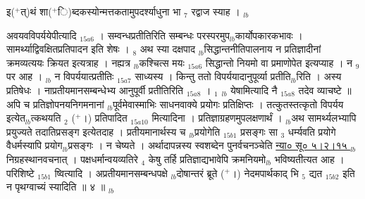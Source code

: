 \documentclass[article,12pt,a4paper]{memoir}%
\newcommand{\add}[1]{($^{+}$#1)}
\newcounter{parCount}
\begin{document}
	  
	  \pstart \leavevmode%
	इ\add{त्}थं शा\add{ि}ब्दकस्योन्मत्तकतामुपदर्श्याधुना {\color{DodgerBlue3}भा {\tiny $_{7}$} रद्वाज} स्याह ।
	{}
	\pend%
      {\tiny $_{lb}$}

	  
	  \pstart \leavevmode%
	\hphantom{.}{\color{DodgerBlue3}अवयवविपर्ययेपीत्यादि} {\tiny $_{15a6}$} । सम्वन्धप्रतीतिरिति सम्बन्धः परस्परमुप{\tiny $_{lb}$}कार्योपकारकभावः । सामर्थ्याद्विवक्षितप्रतिपादन इति शेषः । {\tiny $_{8}$} अथ स्या {\color{DodgerBlue3}दक्षपाद} {\tiny $_{lb}$}सिद्धान्तनीतिपालनाय न प्रतिज्ञादीनां क्रमव्यत्ययः क्रियत इत्यत्राह । {\color{DodgerBlue3}नह्यत्र {\tiny $_{lb}$}कश्चित्स} मयः {\tiny $_{15a6}$} सिद्धान्तो नियमो वा प्रमाणोपेत इत्यप्याह । न {\tiny $_{9}$} \leavevmode{} पर आह । {\tiny $_{lb}$} {\color{DodgerBlue3}न विपर्ययात्प्रतीतिः} {\tiny $_{15a7}$} साध्यस्य । किन्तु ततो विपर्ययादानुपूर्व्या प्रतीति{\tiny $_{lb}$}रिति । अस्य प्रतिषेधः । {\color{DodgerBlue3}नाप्रतीयमानसम्बन्धेभ्य आनुपूर्वी प्रतीतिरिति {\tiny $_{15a8}$} । {\tiny $_{1}$} {\tiny $_{lb}$} येषामित्यादि} नै {\tiny $_{15a8}$} तदेव व्याचष्टे ॥ अपि च प्रतिज्ञोपनयनिगमनानां {\tiny $_{lb}$}पूर्वमेवास्माभिः साधनवाक्ये प्रयोगः प्रतिक्षिप्तः । तत्कुतस्तत्कृतो विपर्यय इत्येत{\tiny $_{lb}$}त्कथयति {\tiny $_{2}$} \add{।} {\color{DodgerBlue3}प्रतिपादित} {\tiny $_{15a10}$} मित्यादिना । प्रतिज्ञाग्रहणमुपलक्षणार्थं । {\tiny $_{lb}$}अथ सामर्थ्यलभ्यापि प्रयुज्यते तदातिप्रसङ्ग इत्येतदाह । {\color{DodgerBlue3}प्रतीयमानार्थस्य च {\tiny $_{lb}$}प्रयोगेति} {\tiny $_{15b1}$} प्रसङ्गः सा {\tiny $_{3}$} धर्म्यवति प्रयोगे वैधर्मस्यापि प्रयोग{\tiny $_{lb}$}प्रसङ्गः । न चेष्यते । अर्थादापन्नस्य स्वशब्देन पुनर्वचनञ्चेति \href{http://sarit.indology.info/?cref=ns\%C5\%AB.5.2.15}{न्या० सू० ५।२।१५ } {\tiny $_{lb}$}निग्रहस्थानवचनात् । पक्षधर्मान्वयव्यतिरे {\tiny $_{4}$} केषु तर्हि प्रतिज्ञाद्यभावेपि क्रमनियमो{\tiny $_{lb}$} \leavevmode{} भविष्यतीत्यत आह । {\color{DodgerBlue3}परिशिष्टे} {\tiny $_{15b1}$} ष्वित्यादि । अप्रतीयमानसम्बन्धपक्षे {\tiny $_{lb}$}दोषान्तरं ब्रूते \add{।} {\color{DodgerBlue3}नेदमपार्थकाद् भि {\tiny $_{5}$} द्यत} {\tiny $_{15b2}$} इति न पृथग्वाच्यं स्यादिति ॥ ४ ॥
	{}
	\pend%
      {\tiny $_{lb}$}
\end{document}
